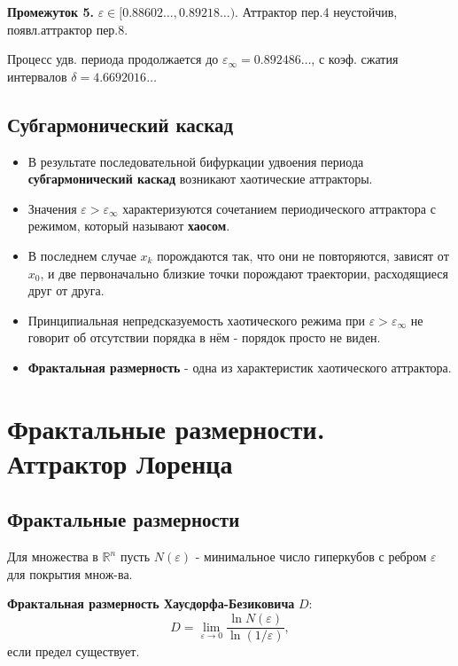 	\textbf{Промежуток 5.} $\varepsilon \in [0.88602\ldots, 0.89218\ldots)$. Аттрактор пер.4 неустойчив, появл.аттрактор пер.8.
	
	Процесс удв. периода продолжается до $\varepsilon_\infty=0.892486\ldots$, с коэф. сжатия интервалов $\delta=4.6692016\ldots$
	
	\subsection{Субгармонический каскад}
	
	\begin{itemize}
		\item В результате последовательной бифуркации удвоения периода 
		\textbf{субгармонический каскад} возникают хаотические аттракторы.
		
		\item Значения \( \varepsilon > \varepsilon_{\infty} \) характеризуются сочетанием периодического аттрактора с режимом, который называют \textbf{хаосом}.
		
		\item В последнем случае \( x_k \) порождаются так, что они не повторяются, зависят от \( x_0 \), и две первоначально близкие точки порождают траектории, расходящиеся друг от друга.
		
		\item Принципиальная непредсказуемость хаотического режима при \( \varepsilon > \varepsilon_{\infty} \) не говорит об отсутствии порядка в нём - порядок просто не виден.
		
		\item \textbf{Фрактальная размерность} - одна из характеристик хаотического аттрактора.
	\end{itemize}
	
	\newpage
	
	\section{Фрактальные размерности. Аттрактор Лоренца}
	
	\subsection{Фрактальные размерности}
	
	Для множества в $\mathbb{R}^n$ пусть $N(\varepsilon)$ - минимальное число гиперкубов с ребром $\varepsilon$ для покрытия множ-ва. 
	\par
	\textbf{Фрактальная размерность Хаусдорфа-Безиковича}  $D$:
	\begin{equation}
		D = \lim_{\varepsilon \to 0} \frac{\ln N(\varepsilon)}{\ln (1 / \varepsilon)},
	\end{equation}
	если предел существует.
	
